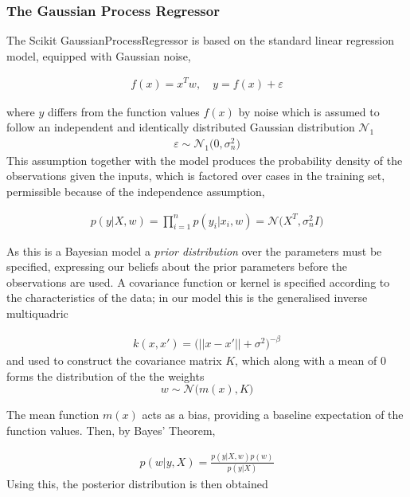 \documentclass[11pt,a4paper]{article}
\begin{document}
\subsubsection{The Gaussian Process Regressor}

The Scikit GaussianProcessRegressor is based on the 
standard linear regression 
model, equipped with Gaussian noise,

\begin{align} 
    f(x) = x^{T}w, \quad{y = f(x) + \varepsilon}
\end{align}

where $y$ differs from the function values $f(x)$ by noise which is assumed
to follow an independent and identically distributed Gaussian distribution
$\mathcal{N}_1$
\begin{align*}
    \varepsilon \sim \mathcal{N}_1 \bigl(0, \sigma_{n}^2\bigr)
\end{align*}
This assumption together with the model produces the 
probability density of the observations given the inputs, 
which is factored over cases in the training set, 
permissible because of the independence assumption,

\begin{align}
    p(y|X,w) = \prod_{i=1}^{n} p(y_i|x_i ,w) = \mathcal{N}\bigl(X^T, \sigma_{n}^2 I\bigr)
\end{align}

As this is a Bayesian model a \textit{prior distribution} over the parameters must be specified, 
expressing our beliefs about the prior
parameters before the observations are used. A covariance function or kernel
is specified according to the characteristics of the data; in our model this 
is the generalised inverse multiquadric

\begin{align}
    k(x,x') = \biggl( ||x-x'|| + \sigma^2\biggr)^{-\beta} \label{eq: gimq}
\end{align}
and used to construct the covariance matrix $K$, which along with 
a mean of $0$ forms the distribution of the the weights 
$$ w \sim \mathcal{N}\bigl(m(x), K\bigr)$$

The mean function $m(x)$ acts as a bias, providing a baseline expectation of the function values. Then, by Bayes' Theorem, 

\begin{align}
    p(w|y, X) = \frac{p(y|X,w) p(w)}{p(y|X)}
\end{align}
Using this, the posterior distribution is then obtained
\end{document}
